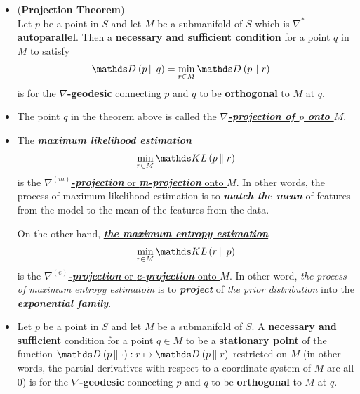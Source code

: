 \documentclass[11pt]{article}
\begin{document}
\begin{itemize}
\item \begin{corollary} (\textbf{Projection Theorem}) \citep{amari2007methods}\\
Let $p$ be a point in $S$ and let $M$ be a submanifold of $S$ which is $\nabla^{*}$-\textbf{autoparallel}. Then a \textbf{necessary and sufficient condition} for a point $q$ in $M$ to satisfy 
\begin{align*}
\divg{}{p}{q} &= \min_{r \in M} \divg{}{p}{r}
\end{align*} is for the \textbf{$\nabla$-geodesic} connecting $p$ and $q$ to be \textbf{orthogonal} to $M$ at $q$.
\end{corollary}

\item \begin{definition}
The point $q$ in the theorem above is called the \underline{\textbf{\emph{$\nabla$-projection of $p$ onto $M$}}}.
\end{definition}

\item \begin{remark}
The \underline{\emph{\textbf{maximum likelihood estimation}}} 
\begin{align*}
\min_{r \in M} \kl{p}{r}
\end{align*} is the \underline{\emph{\textbf{$\nabla^{(m)}$-projection}} or \emph{\textbf{m-projection}} onto $M$}. In other words, the process of maximum likelihood estimation is to \emph{\textbf{match the mean}} of features from the model to the mean of the features from the data.

On the other hand, \underline{\emph{\textbf{the maximum entropy estimation}}}
\begin{align*}
\min_{r \in M} \kl{r}{p}
\end{align*} is the \underline{\emph{\textbf{$\nabla^{(e)}$-projection}} or \emph{\textbf{e-projection}} onto $M$}. In other word, \emph{the process of maximum entropy estimatoin} is to \emph{\textbf{project}} of \emph{the prior distribution} into the \emph{\textbf{exponential family}}.
\end{remark}

\item \begin{theorem}
Let $p$ be a point in $S$ and let $M$ be a submanifold of $S$. A \textbf{necessary and sufficient} condition for a point $q \in M$ to be a \textbf{stationary point}
of the function $\divg{}{p}{\cdot}: r \mapsto  \divg{}{p}{r}$ restricted on $M$ (in other words, the partial derivatives with respect to a coordinate system of $M$ are all $0$) is for the \textbf{$\nabla$-geodesic} connecting $p$ and $q$ to be \textbf{orthogonal} to $M$ at $q$.
\end{theorem}


\end{itemize}
\end{document}
